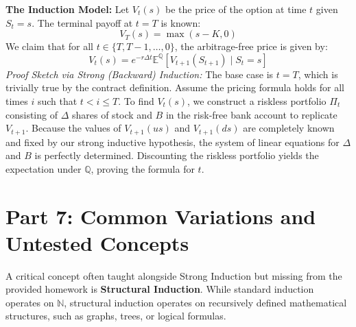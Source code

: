 \documentclass[11pt, a4paper]{article}
\theoremstyle{definition}
\theoremstyle{remark}
\newcommand{\N}{\mathbb{N}}
\newcommand{\Q}{\mathbb{Q}}
\newcommand{\E}{\mathbb{E}}
\begin{document}
\textbf{The Induction Model:}
Let $V_t(s)$ be the price of the option at time $t$ given $S_t = s$. The terminal payoff at $t=T$ is known:
\[ V_T(s) = \max(s - K, 0) \]
We claim that for all $t \in \{T, T-1, \dots, 0\}$, the arbitrage-free price is given by:
\[ V_t(s) = e^{-r \Delta t} \E^\Q [V_{t+1}(S_{t+1}) \mid S_t = s] \]
\textit{Proof Sketch via Strong (Backward) Induction:}
The base case is $t=T$, which is trivially true by the contract definition. Assume the pricing formula holds for all times $i$ such that $t < i \le T$. To find $V_t(s)$, we construct a riskless portfolio $\Pi_t$ consisting of $\Delta$ shares of stock and $B$ in the risk-free bank account to replicate $V_{t+1}$. Because the values of $V_{t+1}(us)$ and $V_{t+1}(ds)$ are completely known and fixed by our strong inductive hypothesis, the system of linear equations for $\Delta$ and $B$ is perfectly determined. Discounting the riskless portfolio yields the expectation under $\Q$, proving the formula for $t$.

\section{Part 7: Common Variations and Untested Concepts}

A critical concept often taught alongside Strong Induction but missing from the provided homework is \textbf{Structural Induction}. While standard induction operates on $\N$, structural induction operates on recursively defined mathematical structures, such as graphs, trees, or logical formulas.
\end{document}
